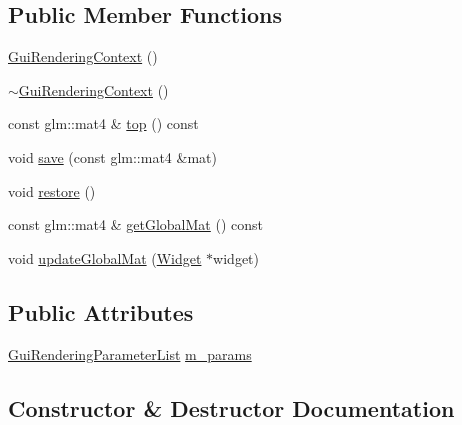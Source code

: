 \subsection*{Public Member Functions}
\begin{DoxyCompactItemize}
\item 
\mbox{\hyperlink{classec__gui_1_1_gui_rendering_context_a5ac76382caed6c538c1c85ab20661355}{Gui\+Rendering\+Context}} ()
\item 
\mbox{\hyperlink{classec__gui_1_1_gui_rendering_context_aaf0dca8a40e65b2ab224b6d29c72b6cc}{$\sim$\+Gui\+Rendering\+Context}} ()
\item 
const glm\+::mat4 \& \mbox{\hyperlink{classec__gui_1_1_gui_rendering_context_a5b5546b385faf66b25571be05aac18dc}{top}} () const
\item 
void \mbox{\hyperlink{classec__gui_1_1_gui_rendering_context_a1ebe7ceaf3bf59891788838669241858}{save}} (const glm\+::mat4 \&mat)
\item 
void \mbox{\hyperlink{classec__gui_1_1_gui_rendering_context_ae7233722fd3c8e106e7543c2410ae0c4}{restore}} ()
\item 
const glm\+::mat4 \& \mbox{\hyperlink{classec__gui_1_1_gui_rendering_context_aedf7b86714d8f96ae3266bdd5c33ac4d}{get\+Global\+Mat}} () const
\item 
void \mbox{\hyperlink{classec__gui_1_1_gui_rendering_context_addd7274c823f916cf068c9875c43624b}{update\+Global\+Mat}} (\mbox{\hyperlink{classec__gui_1_1_widget}{Widget}} $\ast$widget)
\end{DoxyCompactItemize}
\subsection*{Public Attributes}
\begin{DoxyCompactItemize}
\item 
\mbox{\hyperlink{structec__gui_1_1_gui_rendering_parameter_list}{Gui\+Rendering\+Parameter\+List}} \mbox{\hyperlink{classec__gui_1_1_gui_rendering_context_a841f3675bdfab3c2566bc889d25e6e8b}{m\+\_\+params}}
\end{DoxyCompactItemize}


\subsection{Constructor \& Destructor Documentation}
\mbox{\label{classec__gui_1_1_gui_rendering_context_a5ac76382caed6c538c1c85ab20661355}} 
